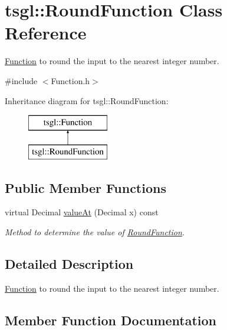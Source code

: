 \hypertarget{classtsgl_1_1_round_function}{}\section{tsgl\+:\+:Round\+Function Class Reference}
\label{classtsgl_1_1_round_function}


\hyperlink{classtsgl_1_1_function}{Function} to round the input to the nearest integer number.  




{\ttfamily \#include $<$Function.\+h$>$}

Inheritance diagram for tsgl\+:\+:Round\+Function\+:\begin{figure}[H]
\begin{center}
\leavevmode
\includegraphics[height=2.000000cm]{classtsgl_1_1_round_function}
\end{center}
\end{figure}
\subsection*{Public Member Functions}
\begin{DoxyCompactItemize}
\item 
virtual Decimal \hyperlink{classtsgl_1_1_round_function_ad01ca0b18d7b5f3f8c5a49181b1dc922}{value\+At} (Decimal x) const
\begin{DoxyCompactList}\small\item\em Method to determine the value of \hyperlink{classtsgl_1_1_round_function}{Round\+Function}. \end{DoxyCompactList}\end{DoxyCompactItemize}


\subsection{Detailed Description}
\hyperlink{classtsgl_1_1_function}{Function} to round the input to the nearest integer number. 

\subsection{Member Function Documentation}
\mbox{\label{classtsgl_1_1_round_function_ad01ca0b18d7b5f3f8c5a49181b1dc922}} 
